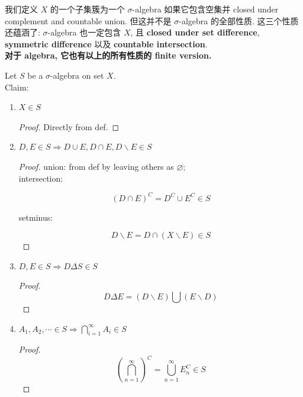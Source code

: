 我们定义 \(X\) 的一个子集簇为一个 \(\sigma\)-algebra 如果它包含空集并 closed under complement and countable union. 但这并不是 \(\sigma\)-algebra 的全部性质. 这三个性质还蕴涵了: \(\sigma\)-algebra 也一定包含 \(X\), 且 \textbf{closed under set difference}, \textbf{symmetric difference} 以及 \textbf{countable intersection}.\\
\textbf{对于 algebra, 它也有以上的所有性质的 finite version.}

\begin{theorem}{}

Let \(S\) be a \(\sigma\)-algebra on set \(X\).\\
Claim:

\begin{enumerate}
\item
  \(X \in S\)

  \begin{proof}

  Directly from def.

  \end{proof}
\item
  \(D,E \in S\Longrightarrow D \cup E,D \cap E,D\backslash E \in S\)

  \begin{proof}

  union: from def by leaving others as \(\varnothing\);\\
  intersection:

  \[(D \cap E)^{C} = D^{C} \cup E^{C} \in S\]

  setminus:

  \[D\backslash E = D \cap (X\backslash E) \in S\]

  \end{proof}
\item
  \(D,E \in S\Longrightarrow D\Delta S \in S\)

  \begin{proof}

  \[D\Delta E = (D\backslash E)\bigcup(E\backslash D)\]

  \end{proof}
\item
  \(A_{1},A_{2},\cdots \in S\Longrightarrow\bigcap_{i = 1}^{\infty}A_{i} \in S\)

  \begin{proof}

  \[(\bigcap\limits_{n = 1}^{\infty})^{C} = \bigcup\limits_{n = 1}^{\infty}E_{n}^{C} \in S\]

  \end{proof}
\end{enumerate}

\end{theorem}

